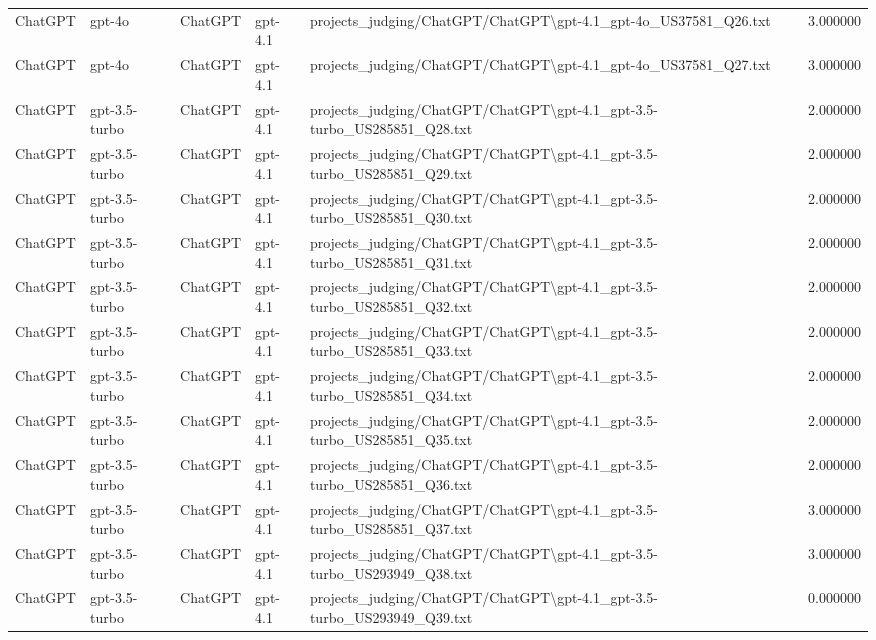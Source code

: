 \begin{table}[H]
\begin{tabular}{lllllr}
ChatGPT & gpt-4o & ChatGPT & gpt-4.1 & projects\_judging/ChatGPT/ChatGPT\textbackslash gpt-4.1\_gpt-4o\_US37581\_Q26.txt & 3.000000 \\
ChatGPT & gpt-4o & ChatGPT & gpt-4.1 & projects\_judging/ChatGPT/ChatGPT\textbackslash gpt-4.1\_gpt-4o\_US37581\_Q27.txt & 3.000000 \\
ChatGPT & gpt-3.5-turbo & ChatGPT & gpt-4.1 & projects\_judging/ChatGPT/ChatGPT\textbackslash gpt-4.1\_gpt-3.5-turbo\_US285851\_Q28.txt & 2.000000 \\
ChatGPT & gpt-3.5-turbo & ChatGPT & gpt-4.1 & projects\_judging/ChatGPT/ChatGPT\textbackslash gpt-4.1\_gpt-3.5-turbo\_US285851\_Q29.txt & 2.000000 \\
ChatGPT & gpt-3.5-turbo & ChatGPT & gpt-4.1 & projects\_judging/ChatGPT/ChatGPT\textbackslash gpt-4.1\_gpt-3.5-turbo\_US285851\_Q30.txt & 2.000000 \\
ChatGPT & gpt-3.5-turbo & ChatGPT & gpt-4.1 & projects\_judging/ChatGPT/ChatGPT\textbackslash gpt-4.1\_gpt-3.5-turbo\_US285851\_Q31.txt & 2.000000 \\
ChatGPT & gpt-3.5-turbo & ChatGPT & gpt-4.1 & projects\_judging/ChatGPT/ChatGPT\textbackslash gpt-4.1\_gpt-3.5-turbo\_US285851\_Q32.txt & 2.000000 \\
ChatGPT & gpt-3.5-turbo & ChatGPT & gpt-4.1 & projects\_judging/ChatGPT/ChatGPT\textbackslash gpt-4.1\_gpt-3.5-turbo\_US285851\_Q33.txt & 2.000000 \\
ChatGPT & gpt-3.5-turbo & ChatGPT & gpt-4.1 & projects\_judging/ChatGPT/ChatGPT\textbackslash gpt-4.1\_gpt-3.5-turbo\_US285851\_Q34.txt & 2.000000 \\
ChatGPT & gpt-3.5-turbo & ChatGPT & gpt-4.1 & projects\_judging/ChatGPT/ChatGPT\textbackslash gpt-4.1\_gpt-3.5-turbo\_US285851\_Q35.txt & 2.000000 \\
ChatGPT & gpt-3.5-turbo & ChatGPT & gpt-4.1 & projects\_judging/ChatGPT/ChatGPT\textbackslash gpt-4.1\_gpt-3.5-turbo\_US285851\_Q36.txt & 2.000000 \\
ChatGPT & gpt-3.5-turbo & ChatGPT & gpt-4.1 & projects\_judging/ChatGPT/ChatGPT\textbackslash gpt-4.1\_gpt-3.5-turbo\_US285851\_Q37.txt & 3.000000 \\
ChatGPT & gpt-3.5-turbo & ChatGPT & gpt-4.1 & projects\_judging/ChatGPT/ChatGPT\textbackslash gpt-4.1\_gpt-3.5-turbo\_US293949\_Q38.txt & 3.000000 \\
ChatGPT & gpt-3.5-turbo & ChatGPT & gpt-4.1 & projects\_judging/ChatGPT/ChatGPT\textbackslash gpt-4.1\_gpt-3.5-turbo\_US293949\_Q39.txt & 0.000000 \\

\end{tabular}
\end{table}
